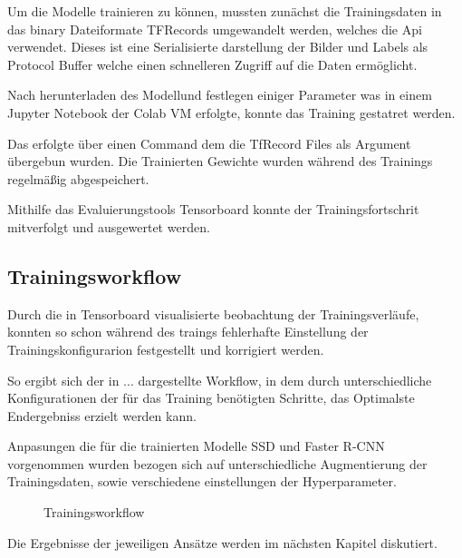 Um die Modelle trainieren zu können, mussten zunächst die 
Trainingsdaten in das binary Dateiformate TFRecords umgewandelt 
werden, welches die Api verwendet. Dieses ist eine Serialisierte 
darstellung der Bilder und Labels als Protocol Buffer welche einen 
schnelleren Zugriff auf die Daten ermöglicht.

Nach herunterladen des Modellund festlegen einiger Parameter was in 
einem Jupyter Notebook der Colab VM erfolgte, konnte das Training 
gestatret werden. 

Das erfolgte über einen Command dem die TfRecord Files als Argument 
übergebun wurden. 
Die Trainierten Gewichte wurden während des Trainings regelmäßig abgespeichert.

Mithilfe das Evaluierungstools Tensorboard konnte der Trainingsfortschrit 
mitverfolgt und ausgewertet werden.


\subsection{Trainingsworkflow}

Durch die in Tensorboard visualisierte beobachtung der 
Trainingsverläufe, konnten so schon während des traings fehlerhafte 
Einstellung der Trainingskonfigurarion festgestellt und korrigiert 
werden.

So ergibt sich der in ... dargestellte Workflow, in dem 
durch unterschiedliche Konfigurationen der für das Training 
benötigten Schritte, das Optimalste Endergebniss erzielt 
werden kann.


Anpasungen die für die trainierten Modelle SSD und Faster 
R-CNN vorgenommen wurden bezogen sich auf unterschiedliche 
Augmentierung der Trainingsdaten, sowie verschiedene 
einstellungen der Hyperparameter.


%     


\begin{figure}[H]
    \centering
    
    \caption{Trainingsworkflow}
    \label{fig:train_workflow}
\end{figure}

Die Ergebnisse der jeweiligen Ansätze werden im nächsten Kapitel diskutiert.


